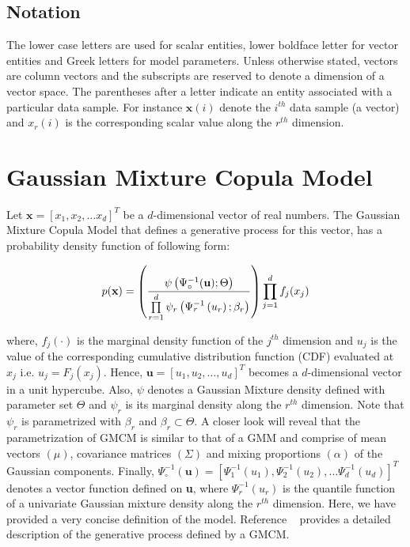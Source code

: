 \documentclass[]{article}
\begin{document}
\subsection{Notation}\label{subsec:Notation}
The lower case letters are used for scalar entities, lower boldface letter for vector entities and Greek letters for model parameters. Unless otherwise stated, vectors are column vectors and the subscripts are reserved to denote a dimension of a vector space. The parentheses after a letter indicate an entity associated with a particular data sample. For instance $\textbf{x}(i)$ denote the $i^{th}$ data sample (a vector) and $x_r(i)$ is the corresponding scalar value along the $r^{th}$ dimension. 
 
\section{Gaussian Mixture Copula Model}\label{sec:GMCM_description}
Let $\textbf{x}= [x_1, x_2,\ldots x_d]^T$ be a $d$-dimensional vector of real numbers. The Gaussian Mixture Copula Model that defines a generative process for this vector, has a probability density function of following form:

\begin{equation}\label{eq:GMCM_density}
p(\textbf{x})=\left( \frac{\psi\left(\Psi_{\circ}^{-1}(\textbf{u});\Theta\right)}{\native_llDenom{}} \right) \prod\limits_{j=1}^{d}f_j(x_j) 
\end{equation} 

where, $f_j(\cdot)$ is the marginal density function of the $j^{th}$ dimension and $u_j$ is the value of the corresponding cumulative distribution function (CDF) evaluated at $x_j$ i.e. $u_j= F_j\left(x_j\right)$. Hence, $\textbf{u} =[u_1, u_2, \ldots , u_d]^T$ becomes a $d$-dimensional vector in a unit hypercube.  Also, $\psi$ denotes a Gaussian Mixture density defined with parameter set $\Theta$ and $\psi_r$ is its marginal density along the $r^{th}$ dimension. Note that $\psi_r$ is parametrized with  $\beta_r$ and $\beta_r \subset \Theta$. A closer look will reveal that the parametrization of GMCM is similar to that of a GMM and comprise of mean vectors $(\mu)$, covariance matrices $(\Sigma)$ and mixing proportions $(\alpha)$ of the Gaussian components. Finally, $\Psi_{\circ}^{-1}(\textbf{u}) = [\Psi_1^{-1}(u_1), \Psi_2^{-1}(u_2), \ldots \Psi_d^{-1}(u_d)]^T $ denotes a vector function defined on \textbf{u}, where $\Psi^{-1}_r(u_r)$ is the quantile function of a univariate Gaussian mixture density along the $r^{th}$ dimension. Here, we have provided a very concise definition of the model. Reference ~\cite{Bilgrau2015} provides a detailed description of the generative process defined by a GMCM. 
\end{document}
